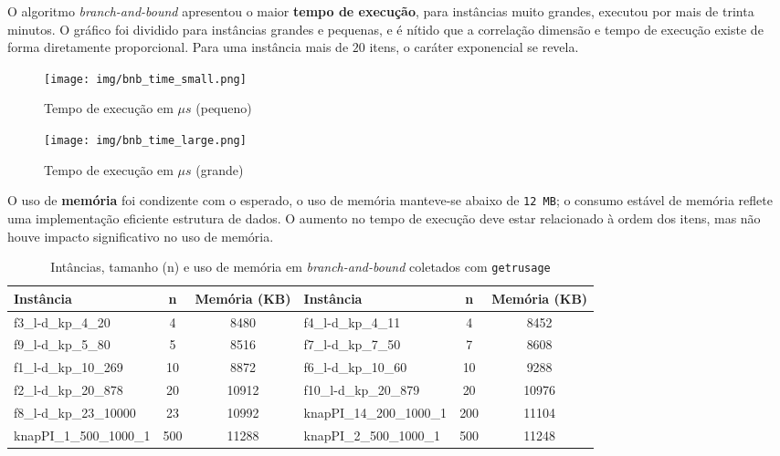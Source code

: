 \documentclass[12pt]{article}
\begin{document}
O algoritmo \textit{branch-and-bound} apresentou o maior \textbf{tempo de execução}, para instâncias muito grandes, executou por mais de trinta minutos. O gráfico foi dividido para instâncias grandes e pequenas, e é nítido que a correlação dimensão e tempo de execução existe de forma diretamente proporcional.
Para uma instância mais de \(20\) itens, o caráter exponencial se revela.

\vspace{-0.5cm}

\begin{figure}[H]
    \centering
    \begin{minipage}[b]{0.48\linewidth}
        \centering
        \texttt{[image: img/bnb\_time\_small.png]}
        \caption{Tempo de execução em \(\mu s\) (pequeno)}
        \label{fig:bnb_small}
    \end{minipage}
    \hfill
    \begin{minipage}[b]{0.48\linewidth}
        \centering
        \texttt{[image: img/bnb\_time\_large.png]}
        \caption{Tempo de execução em \(\mu s\) (grande)}
        \label{fig:bnb_large}
    \end{minipage}
\end{figure}

\vspace{-0.5cm}

O uso de \textbf{memória} foi condizente com o esperado, o uso de memória manteve-se abaixo de \texttt{12 MB}; o consumo estável de memória reflete uma implementação eficiente estrutura de dados. O aumento no tempo de execução deve estar relacionado à ordem dos itens, mas não houve impacto significativo no uso de memória.

\vspace{-0.5cm}


\begin{table}[H]
\centering
\caption{Intâncias, tamanho (n) e uso de memória em \textit{branch-and-bound} coletados com \texttt{getrusage}}
\begin{tabular}{|l|c|c||l|c|c|}
\hline
\textbf{Instância} & \textbf{n} & \textbf{Memória (KB)} & \textbf{Instância} & \textbf{n} & \textbf{Memória (KB)} \\
\hline
f3\_l-d\_kp\_4\_20 & 4 & 8480 & f4\_l-d\_kp\_4\_11 & 4 & 8452 \\
\hline
f9\_l-d\_kp\_5\_80 & 5 & 8516 & f7\_l-d\_kp\_7\_50 & 7 & 8608 \\
\hline
f1\_l-d\_kp\_10\_269 & 10 & 8872 & f6\_l-d\_kp\_10\_60 & 10 & 9288 \\
\hline
f2\_l-d\_kp\_20\_878 & 20 & 10912 & f10\_l-d\_kp\_20\_879 & 20 & 10976 \\
\hline
f8\_l-d\_kp\_23\_10000 & 23 & 10992 & knapPI\_14\_200\_1000\_1 & 200 & 11104 \\
\hline
knapPI\_1\_500\_1000\_1 & 500 & 11288 & knapPI\_2\_500\_1000\_1 & 500 & 11248 \\
\hline
\end{tabular}
\end{table}
\end{document}
